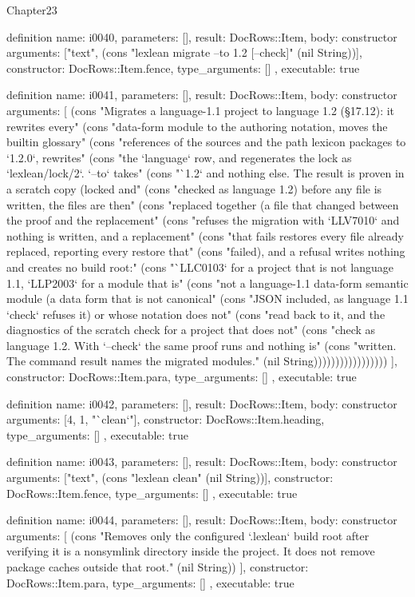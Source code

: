 \begin{lexlean}{Chapter23}
\begin{semanticmodule}
definition{
  name: i0040,
  parameters: [],
  result: DocRows::Item,
  body: constructor{
    arguments: ["text", (cons "lexlean migrate --to 1.2 [--check]" (nil String))],
    constructor: DocRows::Item.fence,
    type_arguments: []
  },
  executable: true
}

definition{
  name: i0041,
  parameters: [],
  result: DocRows::Item,
  body: constructor{
    arguments: [
      (cons "Migrates a language-1.1 project to language 1.2 (§17.12): it rewrites every" (cons "data-form module to the authoring notation, moves the builtin glossary" (cons "references of the sources and the path lexicon packages to `1.2.0`, rewrites" (cons "the `language` row, and regenerates the lock as `lexlean/lock/2`. `--to` takes" (cons "`1.2` and nothing else. The result is proven in a scratch copy (locked and" (cons "checked as language 1.2) before any file is written, the files are then" (cons "replaced together (a file that changed between the proof and the replacement" (cons "refuses the migration with `LLV7010` and nothing is written, and a replacement" (cons "that fails restores every file already replaced, reporting every restore that" (cons "failed), and a refusal writes nothing and creates no build root:" (cons "`LLC0103` for a project that is not language 1.1, `LLP2003` for a module that is" (cons "not a language-1.1 data-form semantic module (a data form that is not canonical" (cons "JSON included, as language 1.1 `check` refuses it) or whose notation does not" (cons "read back to it, and the diagnostics of the scratch check for a project that does not" (cons "check as language 1.2. With `--check` the same proof runs and nothing is" (cons "written. The command result names the migrated modules." (nil String)))))))))))))))))
    ],
    constructor: DocRows::Item.para,
    type_arguments: []
  },
  executable: true
}

definition{
  name: i0042,
  parameters: [],
  result: DocRows::Item,
  body: constructor{
    arguments: [4, 1, "`clean`"],
    constructor: DocRows::Item.heading,
    type_arguments: []
  },
  executable: true
}

definition{
  name: i0043,
  parameters: [],
  result: DocRows::Item,
  body: constructor{
    arguments: ["text", (cons "lexlean clean" (nil String))],
    constructor: DocRows::Item.fence,
    type_arguments: []
  },
  executable: true
}

definition{
  name: i0044,
  parameters: [],
  result: DocRows::Item,
  body: constructor{
    arguments: [
      (cons "Removes only the configured `.lexlean` build root after verifying it is a nonsymlink directory inside the project. It does not remove package caches outside that root." (nil String))
    ],
    constructor: DocRows::Item.para,
    type_arguments: []
  },
  executable: true
}


\end{semanticmodule}
\end{lexlean}
